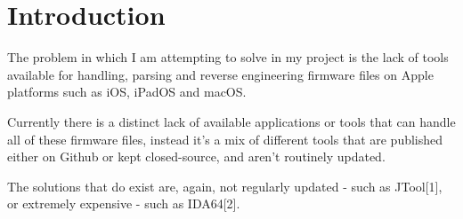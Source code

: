\section{Introduction}

The problem in which I am attempting to solve in my project is the lack of tools available for handling, parsing and reverse engineering firmware files on Apple platforms such as iOS, iPadOS and macOS.

Currently there is a distinct lack of available applications or tools that can handle all of these firmware files, instead it's a mix of different tools that are published either on Github or kept closed-source, and aren't routinely updated.

The solutions that do exist are, again, not regularly updated - such as JTool[1], or extremely expensive - such as IDA64[2].
